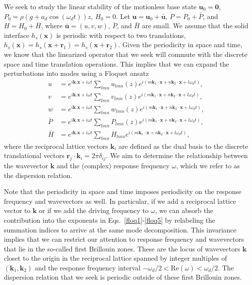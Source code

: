 \documentclass[aps,pre,amsmath,amssymb,floatfix,onecolumn,notitlepage,10pt]{revtex4-1}
\begin{document}
We seek to study the linear stability of the motionless base state $\mathbf{u}_0 = \mathbf{0}$, $P_0 = \rho(g+a_d\cos(\omega_d t))z$, $H_0=0$. Let $\mathbf{u} = \mathbf{u}_0 + \bar{\mathbf{u}}$, $P=P_0+\bar{P}$, and $H=H_0+\bar{H}$, where $\bar{\mathbf{u}} = (u,v,w)$, $\bar{P}$, and $\bar{H}$ are small.  We assume that the solid interface $h_s(\mathbf{x})$ is periodic with respect to two translations, $h_s(\mathbf{x}) = h_s(\mathbf{x}+\mathbf{r}_1) = h_s(\mathbf{x}+\mathbf{r}_2)$. Given the periodicity in space and time, we know that the linearized operator that we seek will commute with the discrete space and time translation operations. This implies \cite{2006_deconinck} that we can expand the perturbations into modes using a Floquet ansatz
\begin{align}
u &= e^{i\mathbf{k}.\mathbf{x} + i\omega t}\sum_{lmn} u_{lmn}(z) e^{i(m\mathbf{k}_1\cdot \mathbf{x} + n\mathbf{k}_2\cdot \mathbf{x} + l\omega_d t)}, \label{floq1} \\
v &= e^{i\mathbf{k}.\mathbf{x} + i\omega t}\sum_{lmn} v_{lmn}(z) e^{i(m\mathbf{k}_1\cdot \mathbf{x} + n\mathbf{k}_2\cdot \mathbf{x} + l\omega_d t)}, \label{floq2} \\
w &= e^{i\mathbf{k}.\mathbf{x} + i\omega t}\sum_{lmn} w_{lmn}(z) e^{i(m\mathbf{k}_1\cdot \mathbf{x} + n\mathbf{k}_2\cdot \mathbf{x} + l\omega_d t)}, \label{floq3} \\
\bar{P} &= e^{i\mathbf{k}.\mathbf{x} + i\omega t}\sum_{lmn} P_{lmn}(z) e^{i(m\mathbf{k}_1\cdot \mathbf{x} + n\mathbf{k}_2\cdot \mathbf{x} + l\omega_d t)}, \label{floq4} \\
\bar{H} &= e^{i\mathbf{k}.\mathbf{x} + i\omega t}\sum_{lmn} H_{lmn} e^{i(m\mathbf{k}_1\cdot \mathbf{x} + n\mathbf{k}_2\cdot \mathbf{x} + l\omega_d t)},  \label{floq5}
\end{align}
where the reciprocal lattice vectors $\mathbf{k}_i$ are defined as the dual basis to the discrete translational vectors $\mathbf{r}_j \cdot \mathbf{k}_i = 2\pi\delta_{ij}$. We aim to determine the relationship between the wavevector $\mathbf{k}$ and the (complex) response frequency $\omega$, which we refer to as the dispersion relation.

Note that the periodicity in space and time imposes periodicity on the response frequency and wavevectors as well. In particular, if we add a reciprocal lattice vector to $\mathbf{k}$ or if we add the driving frequency to $\omega$, we can absorb the contribution into the exponents in Eqs.~\eqref{floq1}-\eqref{floq5} by relabeling the summation indices to arrive at the same mode decomposition. This invariance implies that we can restrict our attention to response frequency and wavevectors that lie in the so-called first Brillouin zones. These are the locus of wavevectors $\mathbf{k}$ closet to the origin in the reciprocal lattice spanned by integer multiples of $(\mathbf{k}_1,\mathbf{k}_2)$ and the response frequency interval $-\omega_d/2 < \mathrm{Re}(\omega) < \omega_d/2$. The dispersion relation that we seek is periodic outside of these first Brillouin zones.
\end{document}
